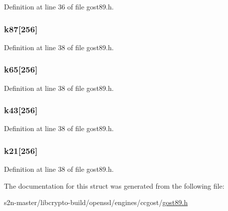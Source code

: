 Definition at line 36 of file gost89.\+h.

\subsubsection[{\texorpdfstring{k87}{k87}}]{ k87\mbox{[}256\mbox{]}}\hypertarget{structgost__ctx_a1ff176d30a3a459d6fae718bfec24136}{}\label{structgost__ctx_a1ff176d30a3a459d6fae718bfec24136}


Definition at line 38 of file gost89.\+h.

\subsubsection[{\texorpdfstring{k65}{k65}}]{ k65\mbox{[}256\mbox{]}}\hypertarget{structgost__ctx_a901173b7237b61afbfc7b958f7a4eb32}{}\label{structgost__ctx_a901173b7237b61afbfc7b958f7a4eb32}


Definition at line 38 of file gost89.\+h.

\subsubsection[{\texorpdfstring{k43}{k43}}]{ k43\mbox{[}256\mbox{]}}\hypertarget{structgost__ctx_a34dd1f48bb5d1e29c1058a7dad3d5a3c}{}\label{structgost__ctx_a34dd1f48bb5d1e29c1058a7dad3d5a3c}


Definition at line 38 of file gost89.\+h.

\subsubsection[{\texorpdfstring{k21}{k21}}]{ k21\mbox{[}256\mbox{]}}\hypertarget{structgost__ctx_a4d82260bd7b49b410516233d275a2b9d}{}\label{structgost__ctx_a4d82260bd7b49b410516233d275a2b9d}


Definition at line 38 of file gost89.\+h.



The documentation for this struct was generated from the following file\+:\begin{DoxyCompactItemize}
\item 
s2n-\/master/libcrypto-\/build/openssl/engines/ccgost/\hyperlink{gost89_8h}{gost89.\+h}\end{DoxyCompactItemize}

